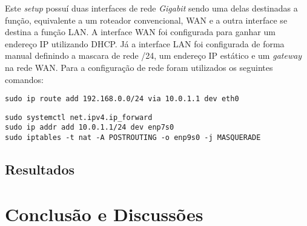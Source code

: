 \documentclass[12pt]{article}
\begin{document}
Este \textit{setup} possuí duas interfaces de rede \textit{Gigabit} sendo uma delas destinadas a função, equivalente a um roteador convencional, WAN e a outra interface se destina a função LAN. 
A interface WAN foi configurada para ganhar um endereço IP utilizando DHCP.
Já a interface LAN foi configurada de forma manual definindo a mascara de rede /24, um endereço IP estático e um \textit{gateway} na rede WAN.
Para a configuração de rede foram utilizados os seguintes comandos:

\begin{lstlisting}
sudo ip route add 192.168.0.0/24 via 10.0.1.1 dev eth0
\end{lstlisting}

\begin{lstlisting}
sudo systemctl net.ipv4.ip_forward 
sudo ip addr add 10.0.1.1/24 dev enp7s0 
sudo iptables -t nat -A POSTROUTING -o enp9s0 -j MASQUERADE 
\end{lstlisting}



\subsection{Resultados}

\section{Conclusão e Discussões}


\end{document}

